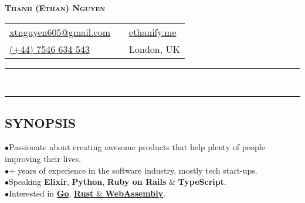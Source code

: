\newcommand{\primary}[1]{\textcolor{primary}{\textbf{#1}}}
\newcommand{\secondary}[1]{\textcolor{secondary}{\textbf{#1}}}
\newcommand{\tertiary}[1]{\textcolor{tertiary}{#1}}

\newcommand{\tbullet}{\textcolor{tertiary}{\textbf{$\bullet$}}\space}
\newcommand{\at}{\textcolor{tertiary}{\textbf{@}}\space}
\newcommand{\then}{\textcolor{tertiary}{$\Rightarrow$}\space}

\newcommand{\keybase}{\textcolor{secondary}{\href{https://keybase.io/ethan605}{\faKey}}}
\newcommand{\github}{\textcolor{secondary}{\href{https://github.com/ethan605}{\faGithub}}}
\newcommand{\linkedin}{\textcolor{secondary}{\href{https://linkedin.com/in/ethan605}{\faLinkedin}}}

\pagestyle{empty}


\setlength\parindent{0pt}
\pagecolor{background}
\color{foreground}

\begin{center}
  \textcolor{primary}{\LARGE\bfseries\scshape{Thanh (Ethan) Nguyen}}
\end{center}

\begin{tabularx}{\textwidth}{
    @{}
    >{\raggedright\arraybackslash}X
    c
    >{\raggedleft\arraybackslash}X
    @{}
  }
  \href{mailto:xtnguyen605@gmail.com}{\textcolor{secondary}{xtnguyen605@gmail.com}} &
    \keybase \space \github \space \linkedin &
    \href{https://ethanify.me}{\textcolor{secondary}{ethanify.me}} \\
  \href{tel:447546634543}{(+44) 7546 634 543} & &
    London, UK \\
\end{tabularx}

\begin{spacing}{0.05}
\rule{\textwidth}{1pt} \\
\rule{\textwidth}{1pt}
\end{spacing}

\subsection*{SYNOPSIS}

\tbullet Passionate about creating awesome products that help plenty of people improving their lives. \\
\tbullet 10+ years of experience in the software industry, mostly tech start-ups. \\
\tbullet Speaking \textbf{Elixir}, \textbf{Python}, \textbf{Ruby on Rails} \& \textbf{TypeScript}. \\
\tbullet Interested in \href{https://github.com/ethan605/aws-vpn-client}{\secondary{Go}},
         \href{https://xkpasswd.ethanify.me}{\secondary{Rust} \& \secondary{WebAssembly}}.

